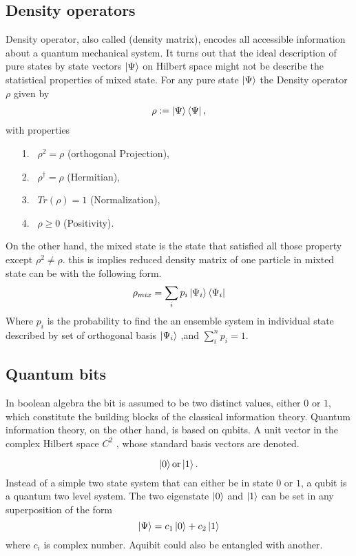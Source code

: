 \subsection{Density operators}\label{DMO}\hfill \break
Density operator, also called (density matrix), encodes all accessible information about a quantum mechanical system. It turns out that the ideal description of pure states by state vectors $\ket{\Psi}$ on Hilbert space might not be describe the statistical properties of mixed state.
For any pure state $\ket{\Psi}$ the Density operator $\rho$ given by
\begin{align}
\rho:=\ket{\Psi}\bra{\Psi},
\end{align}
with properties 
\begin{itemize}
\item[1.] ~$\rho^2=\rho$ (orthogonal Projection),
\item [2.]~$\rho^\dagger =\rho$  (Hermitian),
\item [3.]~$Tr(\rho)=1$  (Normalization),
\item [4.]~$\rho \geqslant 0$ (Positivity).
\end{itemize}
On the other hand, the mixed state is the state that satisfied all those property except $\rho^2\neq\rho$. this is implies reduced  density matrix of  one particle in  mixted state can be with the following form.
\begin{equation}
\rho_{mix }= \sum_{i} p_i \ket{\Psi_i}\bra{\Psi_i}
\end{equation}
Where $p_i$ is the probability to find the an ensemble system in individual state described by set of orthogonal basis $\ket{\Psi_i} $ ,and $\sum_{i}^n p_i=1$.


\subsection{Quantum bits}\hfill \break
In boolean algebra the bit is assumed to be two distinct values, either $0 $ or $1$, which constitute the building blocks of the classical information theory. Quantum information theory, on the other hand, is based on qubits\citep{nielsen2002quantum}. A unit vector in the complex Hilbert space $C^2$ , whose standard basis vectors are denoted.

\begin{equation}
\ket{0}\text{or}\ket{1}.
\end{equation}
Instead of a simple two state system that can either be in state $0$ or $1$, a qubit is a quantum two level system. The two eigenstate $\ket{0}$ and $\ket{1}$  can be set in any superposition of the form
$$\ket{\Psi}=c_1\ket{0}+c_2\ket{1}$$
where $c_i$ is complex number. Aquibit could also be entangled with another.
